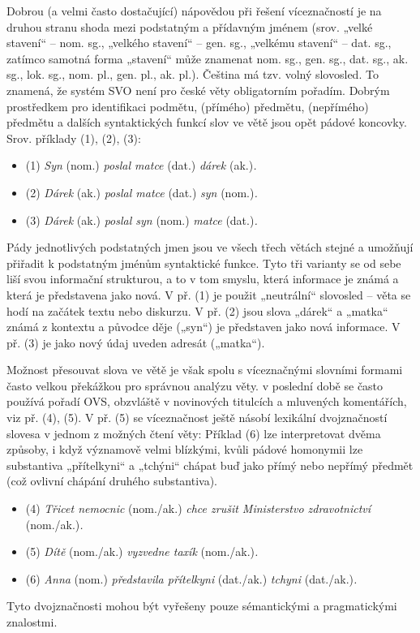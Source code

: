 \documentclass[]{../../metanetpaper}
\begin{document}
\begin{multicols}{2}
Dobrou (a velmi často dostačující) nápovědou při řešení víceznačností je na druhou stranu shoda mezi podstatným a přídavným jménem (srov. „velké stavení“ – nom. sg., „velkého stavení“ – gen. sg., „velkému stavení“ – dat. sg., zatímco samotná forma „stavení“ může znamenat nom. sg., gen. sg., dat. sg., ak. sg., lok. sg., nom. pl., gen. pl., ak. pl.).
Čeština má tzv. volný slovosled. To znamená, že systém SVO není pro české věty obligatorním pořadím. Dobrým prostředkem pro identifikaci podmětu, (přímého) předmětu, (nepřímého) předmětu a dalších syntaktických funkcí slov ve větě jsou opět pádové koncovky. Srov. příklady (1), (2), (3):
\begin{itemize}
\item[] (1)	\textit{Syn} (nom.) \textit{poslal matce} (dat.) \textit{dárek} (ak.)\textit{.}
\item[] (2)	\textit{Dárek} (ak.) \textit{poslal matce} (dat.) \textit{syn} (nom.)\textit{.}
\item[] (3)	\textit{Dárek} (ak.) \textit{poslal syn} (nom.) \textit{matce} (dat.)\textit{.}
\end{itemize}
Pády jednotlivých podstatných jmen jsou ve všech třech větách stejné a umožňují přiřadit k podstatným jménům syntaktické funkce. Tyto tři varianty se od sebe liší svou informační strukturou, a to v tom smyslu, která informace je známá a která je představena jako nová. V př. (1) je použit „neutrální“ slovosled – věta se hodí na začátek textu nebo diskurzu. V př. (2) jsou slova „dárek“ a „matka“ známá z kontextu a původce děje („syn“) je představen jako nová informace. V př. (3) je jako nový údaj uveden adresát („matka“).

Možnost přesouvat slova ve větě je však spolu s víceznačnými slovními formami často velkou překážkou pro správnou analýzu věty. v poslední době se často používá pořadí OVS, obzvláště v novinových titulcích a mluvených komentářích, viz př. (4), (5). V př. (5) se víceznačnost ještě násobí lexikální dvojznačností slovesa v jednom z možných čtení věty:\cite{Note4_cs} Příklad (6) lze interpretovat dvěma způsoby, i když významově velmi blízkými, kvůli pádové homonymii lze substantiva „přítelkyni“ a „tchýni“ chápat buď jako přímý nebo nepřímý předmět (což ovlivní chápání druhého substantiva).
\begin{itemize}
\item[] (4)	\textit{Třicet nemocnic} (nom./ak.) \textit{chce zrušit Ministerstvo zdravotnictví} (nom./ak.)\textit{.}
\item[] (5)	\textit{Dítě} (nom./ak.) \textit{vyzvedne taxík} (nom./ak.)\textit{.}
\item[] (6)	\textit{Anna} (nom.) \textit{představila přítelkyni} (dat./ak.) \textit{tchyni} (dat./ak.)\textit{.}
\end{itemize}
Tyto dvojznačnosti mohou být vyřešeny pouze sémantickými a pragmatickými znalostmi.


\end{multicols}
\end{document}
